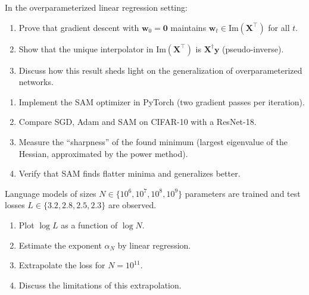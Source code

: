 \begin{exercise}
\label{exo:implicit-bias}
In the overparameterized linear regression setting:
\begin{enumerate}
    \item Prove that gradient descent with $\mathbf{w}_0 = \mathbf{0}$
          maintains $\mathbf{w}_t \in \text{Im}(\mathbf{X}^\top)$ for all $t$.
    \item Show that the unique interpolator in $\text{Im}(\mathbf{X}^\top)$
          is $\mathbf{X}^\dagger \mathbf{y}$ (pseudo-inverse).
    \item Discuss how this result sheds light on the generalization
          of overparameterized networks.
\end{enumerate}
\end{exercise}

\begin{exercise}
\label{exo:sam}
\begin{enumerate}
    \item Implement the SAM optimizer in PyTorch (two gradient passes
          per iteration).
    \item Compare SGD, Adam and SAM on CIFAR-10 with a ResNet-18.
    \item Measure the ``sharpness'' of the found minimum (largest
          eigenvalue of the Hessian, approximated by the power method).
    \item Verify that SAM finds flatter minima and generalizes better.
\end{enumerate}
\end{exercise}

\begin{exercise}
\label{exo:scaling-laws}
Language models of sizes $N \in \{10^6, 10^7, 10^8, 10^9\}$
parameters are trained and test losses $L \in \{3.2, 2.8, 2.5, 2.3\}$ are observed.
\begin{enumerate}
    \item Plot $\log L$ as a function of $\log N$.
    \item Estimate the exponent $\alpha_N$ by linear regression.
    \item Extrapolate the loss for $N = 10^{11}$.
    \item Discuss the limitations of this extrapolation.
\end{enumerate}
\end{exercise}
